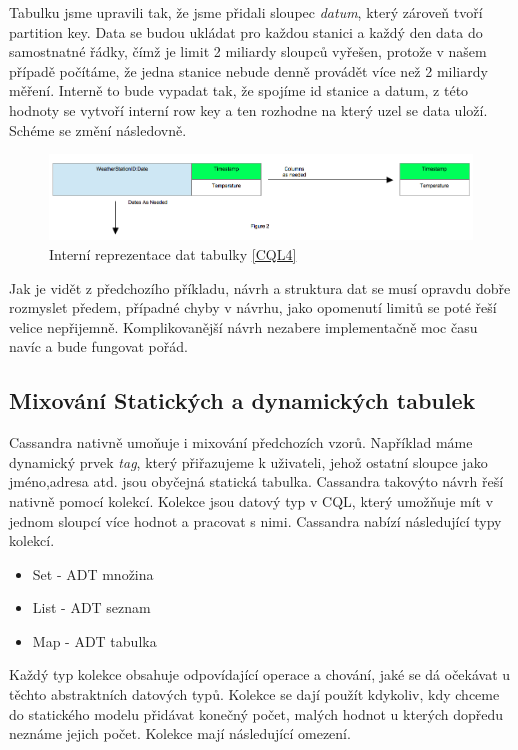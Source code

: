\documentclass[thesis=M,czech]{FITthesis}[2012/06/26]
\begin{document}
Tabulku jsme upravili tak, že jsme přidali sloupec \emph{datum}, který zároveň tvoří partition key. Data se budou ukládat pro každou stanici a každý den data do samostnatné řádky, čímž je limit 2 miliardy sloupců vyřešen, protože v našem případě počítáme, že jedna stanice nebude denně provádět více než 2 miliardy měření. Interně to bude vypadat tak, že spojíme id stanice a datum, z této hodnoty se vytvoří interní row key a ten rozhodne na který uzel se data uloží. Schéme se změní následovně. 

\begin{figure}[h]
\centering
\includegraphics[scale=0.4]{images/timeseries2}
\caption{Interní reprezentace dat tabulky \ref{CQL4}}
\label{fig:timeseries1}
\end{figure}

Jak je vidět z předchozího příkladu, návrh a struktura dat se musí opravdu dobře rozmyslet předem, případné chyby v návrhu, jako opomenutí limitů se poté řeší velice nepřijemně. Komplikovanější návrh nezabere implementačně moc času navíc a bude fungovat pořád.


\subsection{Mixování Statických a dynamických tabulek}
Cassandra nativně umoňuje i mixování předchozích vzorů. Například máme dynamický prvek \emph{tag}, který přiřazujeme k uživateli, jehož ostatní sloupce jako jméno,adresa atd. jsou obyčejná statická tabulka. Cassandra takovýto návrh řeší nativně pomocí kolekcí. Kolekce jsou datový typ v CQL, který umožňuje mít v jednom sloupcí více hodnot a pracovat s nimi. Cassandra nabízí následující typy kolekcí.

\begin{itemize}
\item Set - ADT množina
\item List - ADT seznam
\item Map - ADT tabulka
\end{itemize}

Každý typ kolekce obsahuje odpovídající operace a  chování, jaké se dá očekávat u těchto abstraktních datových typů. Kolekce se dají použít kdykoliv, kdy chceme do statického modelu přidávat konečný počet, malých hodnot u kterých dopředu neznáme jejich počet. Kolekce mají následující omezení. 
\end{document}
